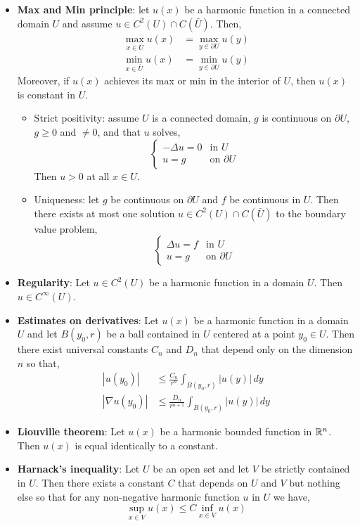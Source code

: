 \documentclass[oneside,a4paper,11pt]{report}
\begin{document}
\begin{itemize}
\item \textbf{Max and Min principle}: let $u(x)$ be a harmonic function in a connected domain $U$ and assume $u \in C^2(U) \cap C(\bar{U})$. Then,
\begin{align*}
\max_{x \in \bar{U}} u(x) &= \max_{y \in \partial U} u(y)\\
\min_{x \in \bar{U}} u(x) & =  \min_{y \in \partial U} u(y)
\end{align*}
Moreover, if $u(x)$ achieves its max or min in the interior of $U$, then $u(x)$ is constant in $U$.

\begin{itemize}
\item Strict positivity: assume $U$ is a connected domain, $g$ is continuous on $\partial U$, $g \ge 0$ and $\neq 0$, and that $u$ solves, 
\[ \begin{cases}
    -\Delta u = 0 & \text{in } U\\
     u = g & \text{on } \partial U
  \end{cases}  \]
Then $u > 0$ at all $x \in U$.

\item Uniqueness: let $g$ be continuous on $\partial U$ and $f$ be continuous in $U$. Then there exists at most one solution $u \in C^2(U) \cap C(\bar{U})$ to the boundary value problem,
\[ \begin{cases}
\Delta u = f & \text{in } U \\
u = g & \text{on } \partial U
\end{cases}\]

\end{itemize}

\item \textbf{Regularity}: Let $u \in C^2(U)$ be a harmonic function in a domain $U$. Then $u \in C^\infty(U)$.

\item \textbf{Estimates on derivatives}:  Let $u(x)$ be a harmonic function in a domain $U$ and let $B(y_0,r)$ be a ball contained in $U$ centered at a point $y_0 \in U$. Then there exist universal constants $C_n$ and $D_n$ that depend only on the dimension $n$ so that,
\begin{align*}
|u(y_0)| & \le \frac{C_n}{r^n} \int_{B(y_0,r)} |u(y)|\,dy \\
|\nabla u(y_0)| & \le \frac{D_n}{r^{n+1}} \int_{B(y_0,r)} |u(y)| \,dy
\end{align*}

\item \textbf{Liouville theorem}: Let $u(x)$ be a harmonic bounded function in ${\mathbb{R}^n}$. Then $u(x)$ is equal identically to a constant.

\item \textbf{Harnack's inequality}: Let $U$ be an open set and let $V$ be strictly contained in $U$. Then there exists a constant $C$ that depends on $U$ and $V$ but nothing else so that for any non-negative harmonic function $u$ in $U$ we have,
\[\sup_{x \in V}u(x) \le C \inf_{x \in V} u(x)\]
\end{itemize}
\end{document}
